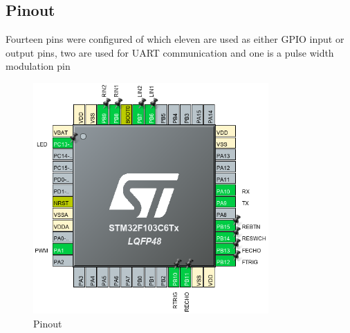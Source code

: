 \subsection{Pinout}
Fourteen pins were configured of which eleven are used as either GPIO input or output pins, two are used for UART communication and one is a pulse width modulation pin

\begin{figure}[htbp]
    \centerline{\includegraphics[width=9cm]{Images/Pinout.png}}
    \caption{Pinout}
    \label{fig8}
\end{figure}

